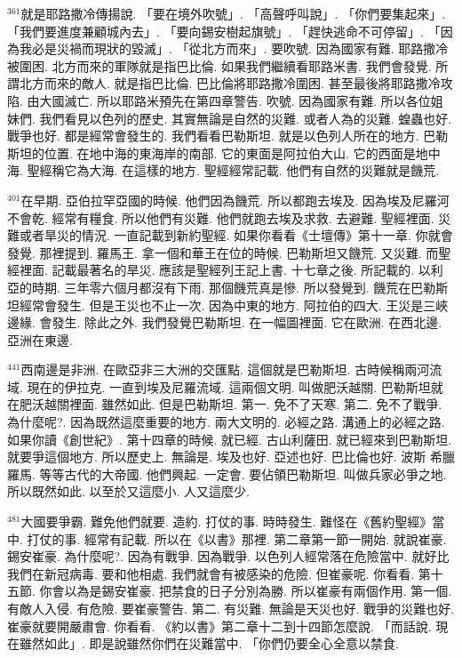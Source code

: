 \documentclass{book}
\begin{document}
$^{361}$就是耶路撒冷傳揚說.
「要在境外吹號」.
「高聲呼叫說」.
「你們要集起來」.
「我們要進度兼顧城內去」.
「要向錫安樹起旗號」.
「趕快逃命不可停留」.
「因為我必是災禍而現狀的毀滅」.
「從北方而來」.
要吹號.
因為國家有難.
耶路撒冷被圍困.
北方而來的軍隊就是指巴比倫.
如果我們繼續看耶路米書.
我們會發覺.
所謂北方而來的敵人.
就是指巴比倫.
巴比倫將耶路撒冷圍困.
甚至最後將耶路撒冷攻陷.
由大國滅亡.
所以耶路米預先在第四章警告.
吹號.
因為國家有難.
所以各位姐妹們.
我們看見以色列的歷史.
其實無論是自然的災難.
或者人為的災難.
蝗蟲也好.
戰爭也好.
都是經常會發生的.
我們看看巴勒斯坦.
就是以色列人所在的地方.
巴勒斯坦的位置.
在地中海的東海岸的南部.
它的東面是阿拉伯大山.
它的西面是地中海.
聖經稱它為大海.
在這樣的地方.
聖經經常記載.
他們有自然的災難就是饑荒.

$^{401}$在早期.
亞伯拉罕亞國的時候.
他們因為饑荒.
所以都跑去埃及.
因為埃及尼羅河不會乾.
經常有糧食.
所以他們有災難.
他們就跑去埃及求救.
去避難.
聖經裡面.
災難或者旱災的情況.
一直記載到新約聖經.
如果你看看《士壇傳》第十一章.
你就會發覺.
那裡提到.
羅馬王.
拿一個和華王在位的時候.
巴勒斯坦又饑荒.
又災難.
而聖經裡面.
記載最著名的旱災.
應該是聖經列王記上書.
十七章之後.
所記載的.
以利亞的時期.
三年零六個月都沒有下雨.
那個饑荒真是慘.
所以發覺到.
饑荒在巴勒斯坦經常會發生.
但是王災也不止一次.
因為中東的地方.
阿拉伯的四大.
王災是三峽邊緣.
會發生.
除此之外.
我們發覺巴勒斯坦.
在一幅圖裡面.
它在歐洲.
在西北邊.
亞洲在東邊.

$^{441}$西南邊是非洲.
在歐亞非三大洲的交匯點.
這個就是巴勒斯坦.
古時候稱兩河流域.
現在的伊拉克.
一直到埃及尼羅流域.
這兩個文明.
叫做肥沃越關.
巴勒斯坦就在肥沃越關裡面.
雖然如此.
但是巴勒斯坦.
第一.
免不了天寒.
第二.
免不了戰爭.
為什麼呢?.
因為既然這麼重要的地方.
兩大文明的.
必經之路.
溝通上的必經之路.
如果你讀《創世紀》.
第十四章的時候.
就已經.
古山利薩田.
就已經來到巴勒斯坦.
就要爭這個地方.
所以歷史上.
無論是.
埃及也好.
亞述也好.
巴比倫也好.
波斯 希臘 羅馬.
等等古代的大帝國.
他們興起.
一定會.
要佔領巴勒斯坦.
叫做兵家必爭之地.
所以既然如此.
以至於又這麼小.
人又這麼少.

$^{481}$大國要爭霸.
難免他們就要.
造約.
打仗的事.
時時發生.
難怪在《舊約聖經》當中.
打仗的事.
經常有記載.
所以在《以書》那裡.
第二章第一節一開始.
就說崔豪.
錫安崔豪.
為什麼呢?.
因為有戰爭.
因為戰爭.
以色列人經常落在危險當中.
就好比我們在新冠病毒.
要和他相處.
我們就會有被感染的危險.
但崔豪呢.
你看看.
第十五節.
你會以為是錫安崔豪.
把禁食的日子分別為勝.
所以崔豪有兩個作用.
第一個.
有敵人入侵.
有危險.
要崔豪警告.
第二.
有災難.
無論是天災也好.
戰爭的災難也好.
崔豪就要開嚴肅會.
你看看.
《約以書》第二章十二到十四節怎麼說.
「而話說.
現在雖然如此」.
即是說雖然你們在災難當中.
「你們仍要全心全意以禁食.
\end{document}
